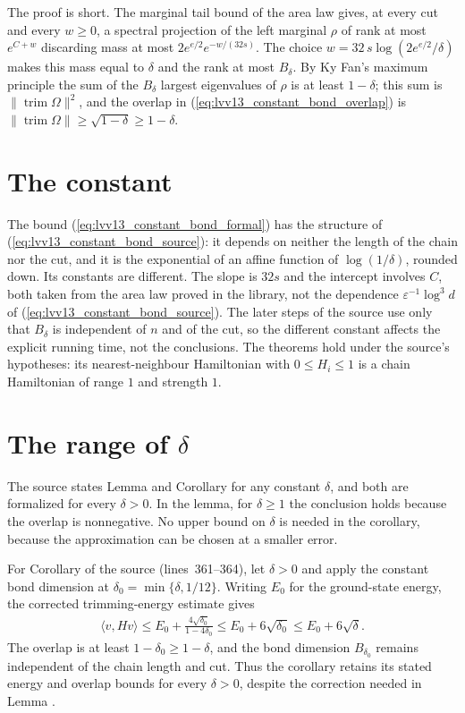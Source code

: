 \documentclass{article}
\begin{document}
The proof is short. The marginal tail bound of the area law gives, at every
cut and every $w\ge0$, a spectral projection of the left marginal $\rho$ of
rank at most $e^{C+w}$ discarding mass at most $2e^{e/2}e^{-w/(32s)}$. The
choice $w=32\,s\log(2e^{e/2}/\delta)$ makes this mass equal to $\delta$ and
the rank at most $B_\delta$. By Ky Fan's maximum principle the sum of the
$B_\delta$ largest eigenvalues of $\rho$ is at least $1-\delta$; this sum is
$\lVert\operatorname{trim}\Omega\rVert^2$, and the overlap in
(\ref{eq:lvv13_constant_bond_overlap}) is $\lVert\operatorname{trim}\Omega
    \rVert\ge\sqrt{1-\delta}\ge1-\delta$.

\section{The constant}

The bound (\ref{eq:lvv13_constant_bond_formal}) has the structure of
(\ref{eq:lvv13_constant_bond_source}): it depends on neither the length of
the chain nor the cut, and it is the exponential of an affine function of
$\log(1/\delta)$, rounded down. Its constants are different. The slope is $32s$ and the
intercept involves $C$, both taken from the area law proved in the library,
not the dependence $\varepsilon^{-1}\log^3d$ of
(\ref{eq:lvv13_constant_bond_source}). The later steps of the source use
only that $B_\delta$ is independent of $n$ and of the cut, so the
different constant affects the explicit running time, not the conclusions.
The theorems hold under the source's hypotheses: its nearest-neighbour
Hamiltonian with $0\le H_i\le1$ is a chain Hamiltonian of range $1$ and
strength $1$.

\section{The range of \texorpdfstring{$\delta$}{delta}}

The source states Lemma  and Corollary
 for any constant $\delta$, and both are formalized for every
$\delta>0$. In the lemma, for $\delta\ge1$ the conclusion holds because the
overlap is nonnegative. No upper bound on $\delta$ is needed in the
corollary, because the approximation can be chosen at a smaller error.

For Corollary  of the source (lines~361--364), let $\delta>0$
and apply the constant bond dimension at $\delta_0=\min\{\delta,1/12\}$.
Writing $E_0$ for the ground-state energy, the corrected trimming-energy
estimate gives
\begin{align}
    \langle v,Hv\rangle
    \le E_0+\frac{4\sqrt{\delta_0}}{1-4\delta_0}
    \le E_0+6\sqrt{\delta_0}\le E_0+6\sqrt\delta.
    \label{eq:lvv13_constant_bond_corollary_energy}
\end{align}
The overlap is at least $1-\delta_0\ge1-\delta$, and the bond dimension
$B_{\delta_0}$ remains independent of the chain length and cut. Thus the
corollary retains its stated energy and overlap bounds for every
$\delta>0$, despite the correction needed in Lemma .
\end{document}
